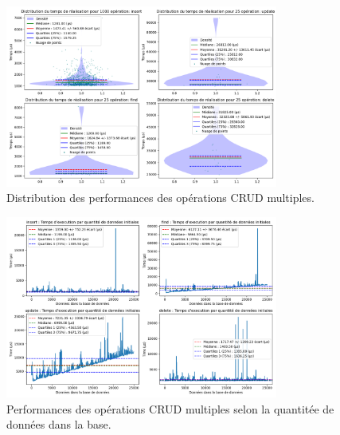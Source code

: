 \documentclass[12pt,a4paper]{report}
\begin{document}
                \begin{figure}[H]
                    \centering
                    \includegraphics[width=0.8\textwidth]{../plots/MongoDB/standalone_indexed/global_test_many.png}
                    \caption{Distribution des performances des opérations CRUD multiples.}
                    \label{fig:mongo_standalone_global_many_indexed}
                \end{figure}

                \begin{figure}[H]
                    \centering
                    \includegraphics[width=0.8\textwidth]{../plots/MongoDB/standalone_indexed/test_many_various_data.png}
                    \caption{Performances des opérations CRUD multiples selon la quantitée de données dans la base.}
                    \label{fig:mongo_standalone_global_many_various_indexed}
                \end{figure}
\end{document}
